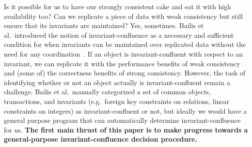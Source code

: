 Is it possible for us to have our strongly consistent cake and eat it with high
availability too? Can we replicate a piece of data with weak consistency but
still ensure that its invariants are maintained? Yes, sometimes. Bailis et al.\
introduced the notion of invariant-confluence as a necessary and sufficient
condition for when invariants can be maintained over replicated data without
the need for any coordination~\cite{bailis2014coordination}. If an object is
invariant-confluent with respect to an invariant, we can replicate it with the
performance benefits of weak consistency and (some of) the correctness benefits
of strong consistency. However, the task of identifying whether or not an
object actually is invariant-confluent remain a challenge. Bailis et al.\
manually categorized a set of common objects, transactions, and invariants
(e.g.\ foreign key constraints on relations, linear constraints on integers) as
invariant-confluent or not, but ideally we would have a general purpose program
that can automatically determine invariant-confluence for us. \textbf{The first
main thrust of this paper is to make progress towards a general-purpose
invariant-confluence decision procedure.}


